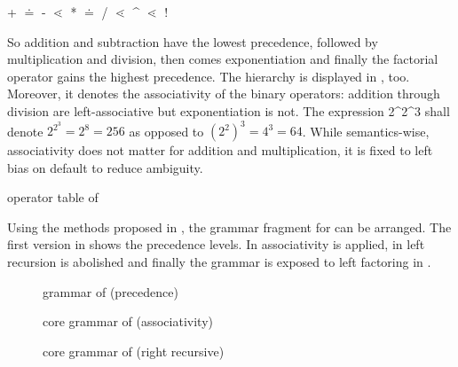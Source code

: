 + $\doteq{}$ - $\lessdot{}$ * $\doteq{}$ / $\lessdot{}$ \^{} $\lessdot{}$ !

So addition and subtraction have the lowest precedence, followed by multiplication and division, then comes exponentiation and finally the factorial operator gains the highest precedence. The hierarchy is displayed in , too. Moreover, it denotes the associativity of the binary operators: addition through division are left-associative but exponentiation is not. The expression 2\^{}2\^{}3 shall denote $2^{2^3}=2^8=256$ as opposed to $(2^2)^3=4^3=64$. While semantics-wise, associativity does not matter for addition and multiplication, it is fixed to left bias on default to reduce ambiguity.

\begin{table}
	\centering
	\caption{operator table of }
	\label{tab:exp_prec}

	
\end{table}

Using the methods proposed in , the grammar fragment for  can be arranged. The first version in  shows the precedence levels. In  associativity is applied, in  left recursion is abolished and finally the grammar is exposed to left factoring in .

%
\begin{figure}
	\centering
	
	

	\caption{grammar of  (precedence)}
	\label{fig:grammar_core_exp_prec}
\end{figure}

\begin{figure}
	\centering
	
	

	\caption{core grammar of  (associativity)}
	\label{fig:grammar_core_exp_assoc}
\end{figure}

\begin{figure}
	\centering
	
	
	
	\caption{core grammar of  (right recursive)}
	\label{fig:grammar_core_exp_RR}
\end{figure}

